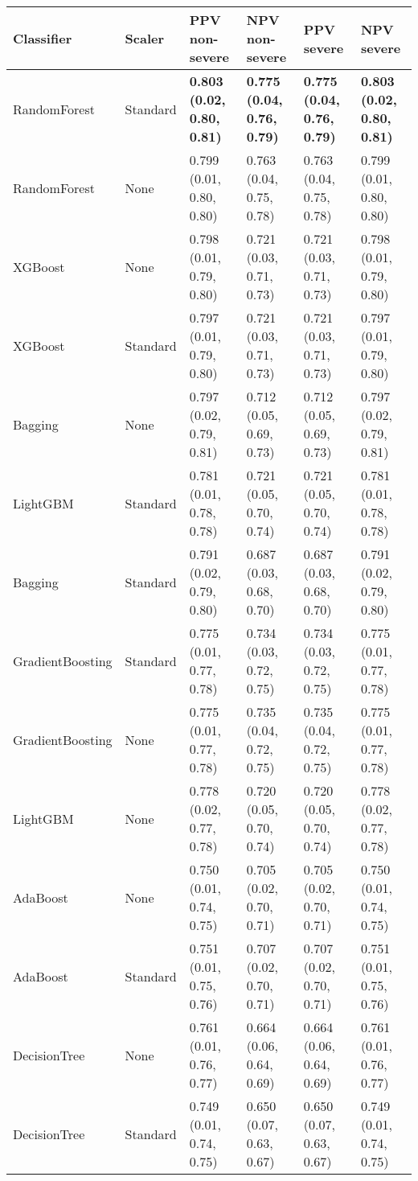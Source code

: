 \begin{tabular}{llllll}
\toprule
Classifier & Scaler & PPV non-severe & NPV non-severe & PPV severe & NPV severe \\
\midrule
RandomForest & Standard & \textbf{0.803 (0.02, 0.80, 0.81)} & \textbf{0.775 (0.04, 0.76, 0.79)} & \textbf{0.775 (0.04, 0.76, 0.79)} & \textbf{0.803 (0.02, 0.80, 0.81)} \\
RandomForest & None & 0.799 (0.01, 0.80, 0.80) & 0.763 (0.04, 0.75, 0.78) & 0.763 (0.04, 0.75, 0.78) & 0.799 (0.01, 0.80, 0.80) \\
XGBoost & None & 0.798 (0.01, 0.79, 0.80) & 0.721 (0.03, 0.71, 0.73) & 0.721 (0.03, 0.71, 0.73) & 0.798 (0.01, 0.79, 0.80) \\
XGBoost & Standard & 0.797 (0.01, 0.79, 0.80) & 0.721 (0.03, 0.71, 0.73) & 0.721 (0.03, 0.71, 0.73) & 0.797 (0.01, 0.79, 0.80) \\
Bagging & None & 0.797 (0.02, 0.79, 0.81) & 0.712 (0.05, 0.69, 0.73) & 0.712 (0.05, 0.69, 0.73) & 0.797 (0.02, 0.79, 0.81) \\
LightGBM & Standard & 0.781 (0.01, 0.78, 0.78) & 0.721 (0.05, 0.70, 0.74) & 0.721 (0.05, 0.70, 0.74) & 0.781 (0.01, 0.78, 0.78) \\
Bagging & Standard & 0.791 (0.02, 0.79, 0.80) & 0.687 (0.03, 0.68, 0.70) & 0.687 (0.03, 0.68, 0.70) & 0.791 (0.02, 0.79, 0.80) \\
GradientBoosting & Standard & 0.775 (0.01, 0.77, 0.78) & 0.734 (0.03, 0.72, 0.75) & 0.734 (0.03, 0.72, 0.75) & 0.775 (0.01, 0.77, 0.78) \\
GradientBoosting & None & 0.775 (0.01, 0.77, 0.78) & 0.735 (0.04, 0.72, 0.75) & 0.735 (0.04, 0.72, 0.75) & 0.775 (0.01, 0.77, 0.78) \\
LightGBM & None & 0.778 (0.02, 0.77, 0.78) & 0.720 (0.05, 0.70, 0.74) & 0.720 (0.05, 0.70, 0.74) & 0.778 (0.02, 0.77, 0.78) \\
AdaBoost & None & 0.750 (0.01, 0.74, 0.75) & 0.705 (0.02, 0.70, 0.71) & 0.705 (0.02, 0.70, 0.71) & 0.750 (0.01, 0.74, 0.75) \\
AdaBoost & Standard & 0.751 (0.01, 0.75, 0.76) & 0.707 (0.02, 0.70, 0.71) & 0.707 (0.02, 0.70, 0.71) & 0.751 (0.01, 0.75, 0.76) \\
DecisionTree & None & 0.761 (0.01, 0.76, 0.77) & 0.664 (0.06, 0.64, 0.69) & 0.664 (0.06, 0.64, 0.69) & 0.761 (0.01, 0.76, 0.77) \\
DecisionTree & Standard & 0.749 (0.01, 0.74, 0.75) & 0.650 (0.07, 0.63, 0.67) & 0.650 (0.07, 0.63, 0.67) & 0.749 (0.01, 0.74, 0.75) \\

\end{tabular}
